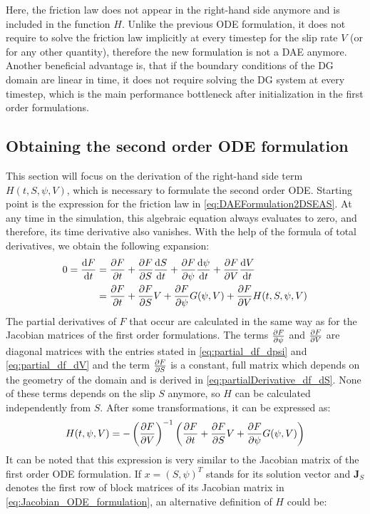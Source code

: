 Here, the friction law does not appear in the right-hand side anymore and is included in the function $H$. Unlike the previous ODE formulation, it does not require to solve the friction law implicitly at every timestep for the slip rate $V$ (or for any other quantity), therefore the new formulation is not a DAE anymore. Another beneficial advantage is, that if the boundary conditions of the DG domain are linear in time, it does not require solving the DG system at every timestep, which is the main performance bottleneck after initialization in the first order formulations. 

\subsection{Obtaining the second order ODE formulation}
This section will focus on the derivation of the right-hand side term $H(t,S,\psi,V)$, which is necessary to formulate the second order ODE. Starting point is the expression for the friction law in \autoref{eq:DAEFormulation2DSEAS}. At any time in the simulation, this algebraic equation always evaluates to zero, and therefore, its time derivative also vanishes. With the help of the formula of total derivatives, we obtain the following expansion: 
\begin{align}
	0 = \dv{F}{t} &= \pdv{F}{t} + \pdv{F}{S}\dv{S}{t} + \pdv{F}{\psi}\dv{\psi}{t} +  \pdv{F}{V}\dv{V}{t} \nonumber\\
					  &= \pdv{F}{t} + \pdv{F}{S}V + \pdv{F}{\psi}G(\psi,V) + \pdv{F}{V}H(t,S,\psi,V)
\end{align}
The partial derivatives of $F$ that occur are calculated in the same way as for the Jacobian matrices of the first order formulations. The terms $\pdv{F}{\psi}$ and $\pdv{F}{V}$ are diagonal matrices with the entries stated in \autoref{eq:partial_df_dpsi} and \autoref{eq:partial_df_dV} and the term $\pdv{F}{S}$ is a constant, full matrix which depends on the geometry of the domain and is derived in \autoref{eq:partialDerivative_df_dS}. None of these terms depends on the slip $S$ anymore, so $H$ can be calculated independently from $S$. After some transformations, it can be expressed as: 
\begin{equation}
	\label{eq:2nd_order_ODE_formulation_sum_of_Jacobians}
	H(t,\psi,V) = -\left(\pdv{F}{V}\right)^{-1}\left(\pdv{F}{t} + \pdv{F}{S}V + \pdv{F}{\psi}G(\psi,V)\right)
\end{equation}
It can be noted that this expression is very similar to the Jacobian matrix of the first order ODE formulation. If $x=(S,\psi)^T$ stands for its solution vector and $\mathbf{J}_{S}$ denotes the first row of block matrices of its Jacobian matrix in \autoref{eq:Jacobian_ODE_formulation}, an alternative definition of $H$ could be: 
